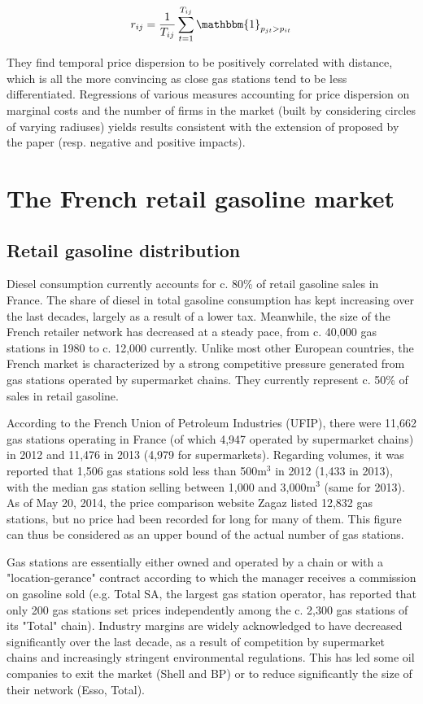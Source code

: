 \documentclass[english]{article}
\begin{document}
\begin{align*}
r_{ij} = \frac{1}{T_{ij}} \sum_{t=1}^{T_{ij}} \mathbbm{1}_{p_{jt} > p_{it}}
\end{align*}

They find temporal price dispersion to be positively correlated with distance, which is all the more convincing as close gas stations tend to be less differentiated. Regressions of various measures accounting for price dispersion on marginal costs and the number of firms in the market (built by considering circles of varying radiuses) yields results consistent with the extension of \cite{VAR80} proposed by the paper (resp. negative and positive impacts).

\section{The French retail gasoline market}

\subsection{Retail gasoline distribution}

Diesel consumption currently accounts for c. 80\% of retail gasoline sales in France. The share of diesel in total gasoline consumption has kept increasing over the last decades, largely as a result of a lower tax. Meanwhile, the size of the French retailer network has decreased at a steady pace, from c. 40,000 gas stations in 1980 to c. 12,000 currently.  Unlike most other European countries, the French market is characterized by a strong competitive pressure generated from gas stations operated by supermarket chains. They currently represent c. 50\% of sales in retail gasoline.

According to the French Union of Petroleum Industries (UFIP), there were 11,662 gas stations operating in France (of which 4,947 operated by supermarket chains) in 2012 and 11,476 in 2013 (4,979 for supermarkets). Regarding volumes, it was reported that 1,506 gas stations sold less than 500m$^{3}$ in 2012 (1,433 in 2013), with the median gas station selling between 1,000 and 3,000m$^{3}$ (same for 2013). As of May 20, 2014, the price comparison website Zagaz listed 12,832 gas stations, but no price had been recorded for long for many of them. This figure can thus be considered as an upper bound of the actual number of gas stations.

Gas stations are essentially either owned and operated by a chain or with a "location-gerance" contract according to which the manager receives a commission on gasoline sold (e.g. Total SA, the largest gas station operator, has reported that only 200 gas stations set prices independently among the c. 2,300 gas stations of its "Total" chain). Industry margins are widely acknowledged to have decreased significantly over the last decade, as a result of competition by supermarket chains and increasingly stringent environmental regulations. This has led some oil companies to exit the market (Shell and BP) or to reduce significantly the size of their network (Esso, Total).
\end{document}
